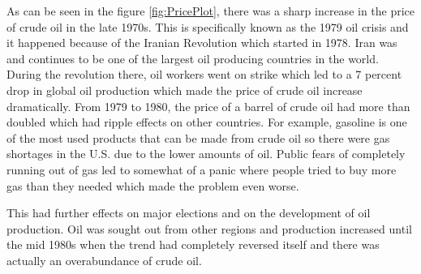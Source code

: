 As can be seen in the figure \ref{fig:PricePlot}, there was a sharp increase in the price of crude oil in the late 
1970s. \cite{Gross_2019} 
This is specifically known as the 1979 oil crisis and it happened because of the Iranian Revolution which started 
in 1978. Iran was and continues to be one of the largest oil producing countries in the world. 
During the revolution there, oil workers went on strike which led to a 7 percent drop in global oil 
production which made the price of crude oil increase dramatically. From 1979 to 1980, the price of a barrel of 
crude oil had more than doubled which had ripple effects on other countries. \cite{Gross_2019} For example, gasoline is one of the 
most used products that can be made from crude oil so there were gas shortages in the U.S. due to the lower amounts 
of oil. Public fears of completely running out of gas led to somewhat of a panic where people tried to buy more 
gas than they needed which made the problem even worse.


This had further effects on major elections and on the development of oil production. 
Oil was sought out from other regions and production increased until the mid 1980s when the 
trend had completely reversed itself and there was actually an overabundance of crude oil. \cite{Gross_2019}

